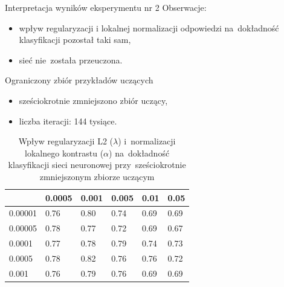 \documentclass[xcolor=dvipsnames]{beamer}
\begin{document}
\begin{frame}{Interpretacja wyników eksperymentu nr 2}
    Obserwacje:
    \begin{itemize}
        \item wpływ regularyzacji i lokalnej normalizacji odpowiedzi na~dokładność klasyfikacji pozostał taki sam,
        \item sieć nie~została przeuczona.
    \end{itemize}
    \vspace{5mm}
\end{frame}
\begin{frame}{Ograniczony zbiór przykładów uczących}
    \begin{itemize}
        \item sześciokrotnie zmniejszono zbiór uczący,
        \item liczba iteracji: 144 tysiące.
    \end{itemize}
    \begin{table}[H]
        \centering
        \begin{tabular}{|l|l|l|l|l|l|}
            \hline
            \backslashbox{$\alpha$}{$\lambda$} & 0.0005 & 0.001 & 0.005 & 0.01 & 0.05 \\
            \hline
            0.00001 & 0.76 & 0.80 & 0.74 & 0.69 & 0.69 \\
            \hline
            0.00005 & 0.78 & 0.77 & 0.72 & 0.69 & 0.67 \\
            \hline
            0.0001  & 0.77 & 0.78 & 0.79 & 0.74 & 0.73 \\
            \hline
            0.0005  & 0.78 & 0.82 & 0.76 & 0.76 & 0.72 \\
            \hline
            0.001   & 0.76 & 0.79 & 0.76 & 0.69 & 0.69 \\
            \hline
        \end{tabular}
        \caption{Wpływ regularyzacji L2 ($\lambda$) i~normalizacji lokalnego kontrastu ($\alpha$) na~dokładność klasyfikacji
        sieci neuronowej przy~sześciokrotnie zmniejszonym zbiorze uczącym}
        \label{table:wyniki3}
    \end{table}
\end{frame}
\end{document}
